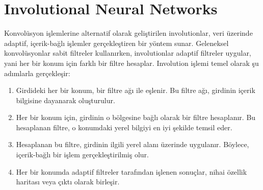 \section{Involutional Neural Networks}

Konvolüsyon işlemlerine alternatif olarak geliştirilen involutionlar, veri üzerinde adaptif, içerik-bağlı işlemler gerçekleştiren bir yöntem sunar. Geleneksel konvolüsyonlar sabit filtreler kullanırken, involutionlar adaptif filtreler uygular, yani her bir konum için farklı bir filtre hesaplar. Involution işlemi temel olarak şu adımlarla gerçekleşir:

\begin{enumerate}
    \item Girdideki her bir konum, bir filtre ağı ile eşlenir. Bu filtre ağı, girdinin içerik bilgisine dayanarak oluşturulur.
    \item Her bir konum için, girdinin o bölgesine bağlı olarak bir filtre hesaplanır. Bu hesaplanan filtre, o konumdaki yerel bilgiyi en iyi şekilde temsil eder.
    \item Hesaplanan bu filtre, girdinin ilgili yerel alanı üzerinde uygulanır. Böylece, içerik-bağlı bir işlem gerçekleştirilmiş olur.
    \item Her bir konumda adaptif filtreler tarafından işlenen sonuçlar, nihai özellik haritası veya çıktı olarak birleşir.
\end{enumerate}

\newpage